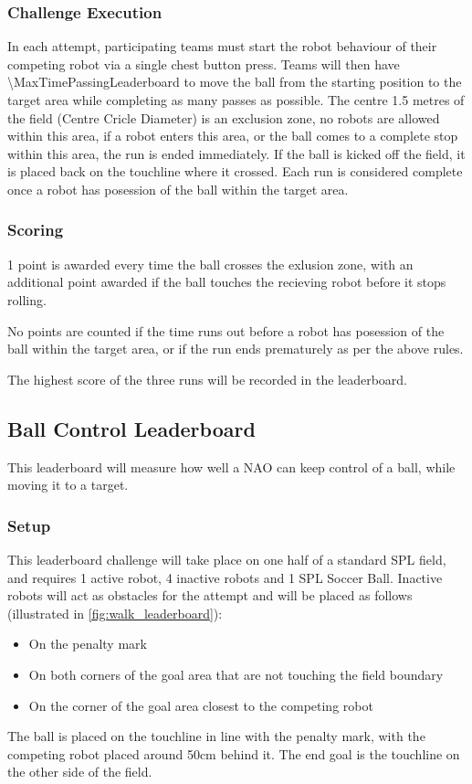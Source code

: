 \subsubsection{Challenge Execution}
In each attempt, participating teams must start the robot behaviour of their competing robot via a single chest button
press. Teams will then have \qty{\MaxTimePassingLeaderboard}{\sec} to move the ball from the starting
position to the target area while completing as many passes as possible. The centre
1.5 metres of the field (Centre Cricle Diameter) is an exclusion zone, no robots are allowed within this area,
if a robot enters this area, or the ball comes to a complete stop
within this area, the run is ended immediately. If the ball is kicked off the field,
it is placed back on the touchline where it crossed. Each run is considered complete
once a robot has posession of the ball within the target area.

\subsubsection{Scoring}
1 point is awarded every time the ball crosses the exlusion zone, with an additional point
awarded if the ball touches the recieving robot before it stops rolling.

No points are counted if the time runs out before a robot has posession of the ball
within the target area, or if the run ends prematurely as per the above rules.

The highest score of the three runs will be recorded in the leaderboard.

\subsection{Ball Control Leaderboard}
This leaderboard will measure how well a NAO can keep control of a ball, while moving it
to a target.

\subsubsection{Setup}
This leaderboard challenge will take place on one half of a standard SPL field, and requires 1 active robot, 4 inactive robots and 1 SPL Soccer Ball.
Inactive robots will act as obstacles for the attempt and will be placed as follows (illustrated in \cref{fig:walk_leaderboard}):
\begin{itemize}
    \item On the penalty mark
    \item On both corners of the goal area that are not touching the field boundary
    \item On the corner of the goal area closest to the competing robot
\end{itemize}
The ball is placed on the touchline in line with the penalty mark, with the competing
robot placed around 50cm behind it.
The end goal is the touchline on the other side of the field.

